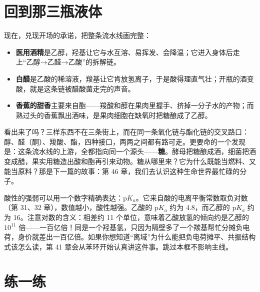 \section{回到那三瓶液体}

现在，兑现开场的承诺，把整条流水线画完整：

\begin{itemize}[itemsep=2pt]
\item \textbf{医用酒精}是乙醇，羟基让它与水互溶、易挥发、会降温；它进入身体后走上“乙醇→乙醛→乙酸”的拆解链。
\item \textbf{白醋}是乙酸的稀溶液，羧基让它肯放氢离子，于是酸得理直气壮；开瓶的酒变酸，就是这条链被醋酸菌走完的声音。
\item \textbf{香蕉的甜香}主要来自酯——羧酸和醇在果肉里握手、挤掉一分子水的产物；而熟过头的香蕉飘出酒味，是果肉细胞在缺氧时把糖酿成了乙醇。
\end{itemize}

看出来了吗？三样东西不在三条街上，而在同一条氧化链与酯化链的交叉路口：醇、醛（酮）、羧酸、酯，四种接口，两两之间都有路可走。更要命的一个发现是：这条流水线的上游，全都指向同一个源头——\textbf{糖}。酵母把糖酿成酒，细菌把酒变成醋，果实用糖造出酸和酯再引来动物。糖从哪里来？它为什么既能当燃料、又能当原料？那是下一篇的故事：第 46 章，我们去认识这种生命世界最忙碌的分子。

\begin{tiaozhan}
酸性的强弱可以用一个数字精确表达：$\mathrm{p}K_a$。它来自酸的电离平衡常数取负对数（第 31、32 章），数值越小，酸性越强。乙酸的 $\mathrm{p}K_a$ 约为 4.8，而乙醇的 $\mathrm{p}K_a$ 约为 16。注意对数的含义：相差约 11 个单位，意味着乙酸放氢的倾向约是乙醇的 $10^{11}$ 倍——一百亿倍！同是一个羟基氢，只因为隔壁多了一个羰基帮忙分摊负电荷，身价就差出一百亿倍。如果你想知道“离域”为什么能把负电荷摊平、共振结构式该怎么读，第 41 章会从苯环开始认真讲这件事。跳过本框不影响主线。
\end{tiaozhan}

\section*{练一练}


